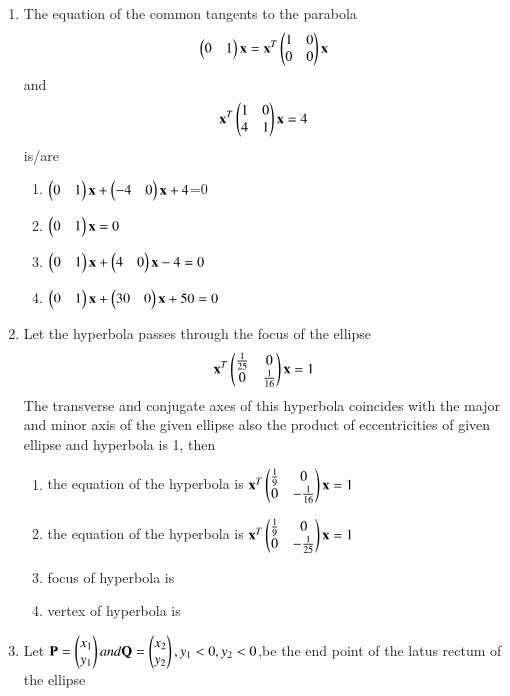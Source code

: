 \documentclass[journal,12pt,twocolumn]{IEEEtran}
\begin{document}
\begin{enumerate}[label=\arabic*]
    \item The equation of the common tangents to the parabola 
    \begin{align}
    \begin{pmatrix}0&1\end{pmatrix}\mathbf{x}= \mathbf{x}^T\begin{pmatrix}1& 0 \\0 & 0\end{pmatrix} \mathbf{x} 
    \end{align} and 
    \begin{align}
    \mathbf{x}^T\begin{pmatrix} 1& 0 \\4 & 1 \end{pmatrix} \mathbf{x}=4
    \end{align} is/are 
    \begin{enumerate}
    \item $\begin{pmatrix}0&1\end{pmatrix}\mathbf{x}+\begin{pmatrix}-4&0\end{pmatrix}\mathbf{x}+4$=0
    \item $\begin{pmatrix}0&1\end{pmatrix}\mathbf{x}=0$
    \item $\begin{pmatrix}0&1\end{pmatrix}\mathbf{x}+\begin{pmatrix}4&0\end{pmatrix}\mathbf{x}-4=0$
    \item $\begin{pmatrix}0&1\end{pmatrix}\mathbf{x}+\begin{pmatrix}30&0\end{pmatrix}\mathbf{x}+50=0$
    \end{enumerate}
    \item Let the hyperbola passes through the focus of the ellipse 
    \begin{align} 
    \mathbf{x}^T\begin{pmatrix}\frac{1}{25}& 0 \\0 & \frac{1}{16}\end{pmatrix} \mathbf{x}=1
    \end{align} The transverse and conjugate axes of this hyperbola coincides with the major and minor axis of the given ellipse also the product of eccentricities of given ellipse and hyperbola is 1, then 
    \begin{enumerate}
    \item the equation of the hyperbola is 
    $\mathbf{x}^T \begin{pmatrix}\frac{1}{9}&0 \\0 & -\frac{1}{16}\end{pmatrix} \mathbf{x} =1$
    \item the equation of the hyperbola is
    $\mathbf{x}^T \begin{pmatrix}\frac{1}{9}& 0 \\0 & -\frac{1}{25}\end{pmatrix}\mathbf{x}=1$
    \item focus of hyperbola is 
    \item vertex of hyperbola is 
    \end{enumerate}
    \item Let $\mathbf{P}=\begin{pmatrix}x_1\\y_1\end{pmatrix}and \mathbf{Q}=\begin{pmatrix}x_2\\y_2\end{pmatrix},y_1<0,y_2<0$,be the end point of the latus rectum of the ellipse 
    \begin{align}

\end{align}
\end{enumerate}
\end{document}
